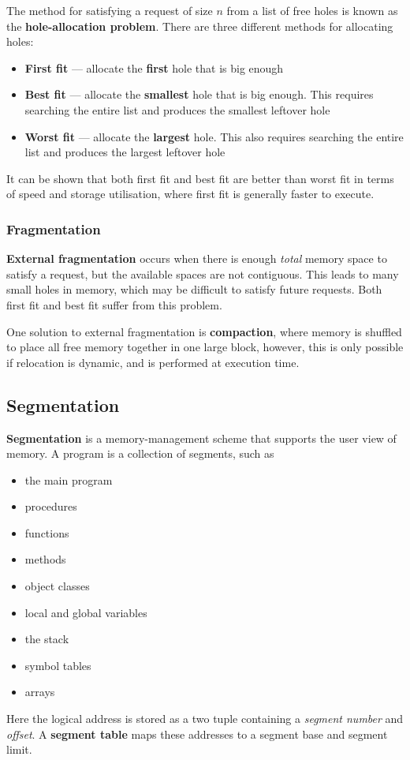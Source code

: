 \documentclass{article}
\begin{document}
The method for satisfying a request of size \(n\) from a list of free
holes is known as the \textbf{hole-allocation problem}. There are three
different methods for allocating holes:
\begin{itemize}
    \item \textbf{First fit} --- allocate the \textbf{first} hole that is big
          enough
    \item \textbf{Best fit} --- allocate the \textbf{smallest} hole that is big
          enough. This requires searching the entire list and produces the smallest leftover hole
    \item \textbf{Worst fit} --- allocate the \textbf{largest} hole. This also
          requires searching the entire list and produces the largest leftover hole
\end{itemize}
It can be shown that both first fit and best fit are better than worst
fit in terms of speed and storage utilisation, where first fit is
generally faster to execute.
\subsubsection{Fragmentation}
\textbf{External fragmentation} occurs when there is enough \textit{total}
memory space to satisfy a request, but the available spaces are not
contiguous. This leads to many small holes in memory, which may be
difficult to satisfy future requests. Both first fit and best fit
suffer from this problem.

One solution to external fragmentation is \textbf{compaction}, where
memory is shuffled to place all free memory together in one large
block, however, this is only possible if relocation is dynamic, and is
performed at execution time.
\subsection{Segmentation}
\textbf{Segmentation} is a memory-management scheme that supports the
user view of memory. A program is a collection of segments, such as
\begin{itemize}
    \item the main program
    \item procedures
    \item functions
    \item methods
    \item object classes
    \item local and global variables
    \item the stack
    \item symbol tables
    \item arrays
\end{itemize}
Here the logical address is stored as a two tuple containing a
\textit{segment number} and \textit{offset}. A \textbf{segment table}
maps these addresses to a segment base and segment limit.
\end{document}
